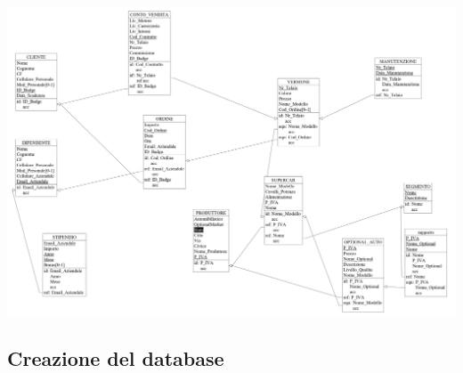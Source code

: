 \documentclass[11pt]{article}
\begin{document}
\begin{center}
    \includegraphics[scale=0.89, angle=90]{images/schemaRelazionale.jpeg}
\end{center}

\newpage

\subsection{Creazione del database}

\lstset{style=sqlStyle}
\end{document}
